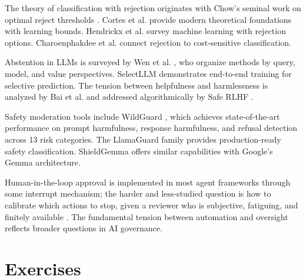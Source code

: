 The theory of classification with rejection originates with Chow's seminal work on optimal reject thresholds \cite{chow1970optimum}. Cortes et al. \cite{cortes2016learning} provide modern theoretical foundations with learning bounds. Hendrickx et al. \cite{hendrickx2024survey} survey machine learning with rejection options. Charoenphakdee et al. \cite{charoenphakdee2021rejection} connect rejection to cost-sensitive classification.

Abstention in LLMs is surveyed by Wen et al. \cite{wen2024abstention}, who organize methods by query, model, and value perspectives. SelectLLM \cite{yoshikawa2025selectllm} demonstrates end-to-end training for selective prediction. The tension between helpfulness and harmlessness is analyzed by Bai et al. \cite{bai2022training} and addressed algorithmically by Safe RLHF \cite{dai2024safe}.

Safety moderation tools include WildGuard \cite{han2024wildguard}, which achieves state-of-the-art performance on prompt harmfulness, response harmfulness, and refusal detection across 13 risk categories. The LlamaGuard family provides production-ready safety classification. ShieldGemma \cite{zeng2024shieldgemma} offers similar capabilities with Google's Gemma architecture.

Human-in-the-loop approval is implemented in most agent frameworks through some interrupt mechanism; the harder and less-studied question is how to calibrate which actions to stop, given a reviewer who is subjective, fatiguing, and finitely available \cite{oversightcap2026}. The fundamental tension between automation and oversight reflects broader questions in AI governance.

\section*{Exercises}

